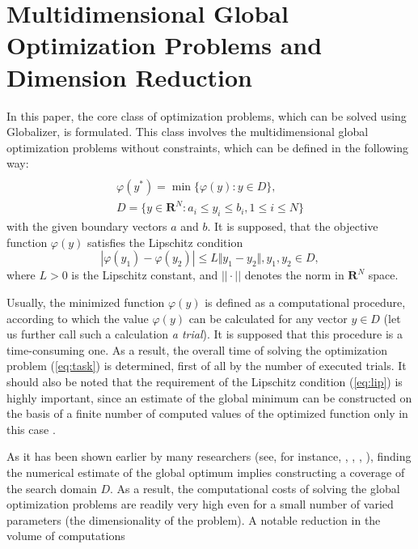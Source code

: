\documentclass{aims}
\theoremstyle{definition}
\begin{document}
\section{Multidimensional Global Optimization Problems and Dimension Reduction}
\label{sec:problem}
In this paper, the core class of optimization problems, which can be solved using
Globalizer, is formulated. This class involves the multidimensional global
optimization problems without constraints, which can be defined in the following way:
\begin{equation}
\label{eq:task}
\begin{array}{cr}\\
  \varphi(y^*)=\min\{\varphi(y):y\in D\}, \\
  D=\{y\in \mathbf{R}^N:a_i\leq y_i\leq{b_i}, 1\leq{i}\leq{N}\}
\end{array}
\end{equation}
with the given boundary vectors  $a$ and  $b$. It is supposed, that the objective function \(\varphi(y)\) satisfies the Lipschitz condition
\begin{equation}
\label{eq:lip}
|\varphi(y_1)-\varphi(y_2)|\leq L\Vert y_1-y_2\Vert,y_1,y_2\in D,
\end{equation}
where \(L>0\) is the Lipschitz constant, and \(||\cdot||\) denotes the norm in \(\mathbf{R}^N\) space.
\par
Usually, the minimized function \(\varphi(y)\) is defined as a computational procedure,
according to which the value \(\varphi(y)\) can be calculated for any vector \(y\in D\)
(let us further call such a calculation \textit{a trial}). It is supposed that this procedure
is a time-consuming one. As a result, the overall time of solving the optimization
problem (\ref{eq:task}) is determined, first of all by the number of executed trials.
It should also be noted that the requirement of the Lipschitz condition (\ref{eq:lip})
is highly important, since an estimate of the global minimum can be constructed on the
basis of a finite number of computed values of the optimized function only in this case .
\par
As it has been shown earlier by many researchers
(see, for instance, \cite{floudasPardalosGOState}, \cite{horstTuyGO}, \cite{pinterGO}, \cite{strSergGO}),
finding the numerical estimate of the global optimum implies constructing a coverage of
the search domain \(D\). As a result, the computational costs of solving the global
optimization problems are readily very high even for a small number of varied parameters
(the dimensionality of the problem). A notable reduction in the volume of computations
\end{document}
